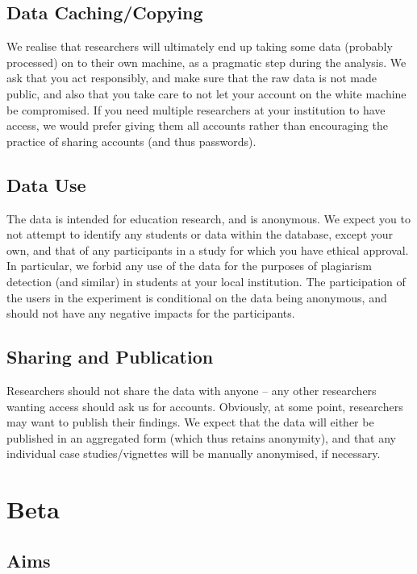 \documentclass{report}
\begin{document}
\section{Data Caching/Copying}

We realise that researchers will ultimately end up taking some data (probably
processed) on to their own machine, as a pragmatic step during the analysis.
We ask that you act responsibly, and make sure that the raw data is not made
public, and also that you take care to not let your account on the white
machine be compromised.  If you need multiple researchers at your institution
to have access, we would prefer giving them all accounts rather than
encouraging the practice of sharing accounts (and thus passwords).


\section{Data Use}

The data is intended for education research, and is anonymous.  We expect you
to not attempt to identify any students or data within the database, except
your own, and that of any participants in a study for which you have ethical
approval.  In particular, we forbid any use of the data for the purposes of
plagiarism detection (and similar) in students at your local institution.  The
participation of the users in the experiment is conditional on the data being
anonymous, and should not have any negative impacts for the participants.

\section{Sharing and Publication}

Researchers should not share the data with anyone -- any other researchers
wanting access should ask us for accounts.  Obviously, at some point,
researchers may want to publish their findings.  We expect that the data will
either be published in an aggregated form (which thus retains anonymity), and
that any individual case studies/vignettes will be manually anonymised, if
necessary.

\chapter{Beta}

\section{Aims}
\end{document}
